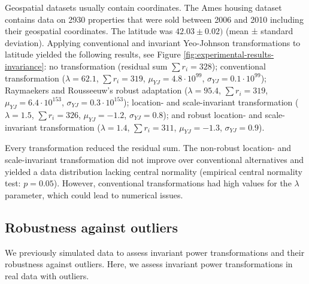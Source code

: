 \documentclass[preprint,12pt,authoryear]{elsarticle}
\begin{document}
Geospatial datasets usually contain coordinates. The Ames housing
dataset contains data on 2930 properties that were sold between 2006 and
2010 \citep{De-Cock2011-jf} including their geospatial coordinates. The
latitude was \(42.03 \pm 0.02)\) (mean ± standard deviation). Applying
conventional and invariant Yeo-Johnson transformations to latitude
yielded the following results, see Figure
\ref{fig:experimental-results-invariance}: no transformation (residual
sum \(\sum r_i = 328\)); conventional transformation
(\(\lambda = 62.1\), \(\sum r_i = 319\),
\(\mu_{YJ} = 4.8 \cdot 10^{99}\), \(\sigma_{YJ} = 0.1 \cdot 10^{99}\));
Raymaekers and Rousseeuw's robust adaptation (\(\lambda = 95.4\),
\(\sum r_i = 319\), \(\mu_{YJ} = 6.4 \cdot 10^{153}\),
\(\sigma_{YJ} = 0.3 \cdot 10^{153}\)); location- and scale-invariant
transformation (\(\lambda = 1.5\), \(\sum r_i = 326\),
\(\mu_{YJ} = -1.2\), \(\sigma_{YJ} = 0.8\)); and robust location- and
scale-invariant transformation (\(\lambda = 1.4\), \(\sum r_i = 311\),
\(\mu_{YJ} = -1.3\), \(\sigma_{YJ} = 0.9\)).

Every transformation reduced the residual sum. The non-robust location-
and scale-invariant transformation did not improve over conventional
alternatives and yielded a data distribution lacking central normality
(empirical central normality test: \(p=0.05\)). However, conventional
transformations had high values for the \(\lambda\) parameter, which
could lead to numerical issues.

\subsection{Robustness against
outliers}\label{sec:robustness-against-outliers}

We previously simulated data to assess invariant power transformations
and their robustness against outliers. Here, we assess invariant power
transformations in real data with outliers.
\end{document}
